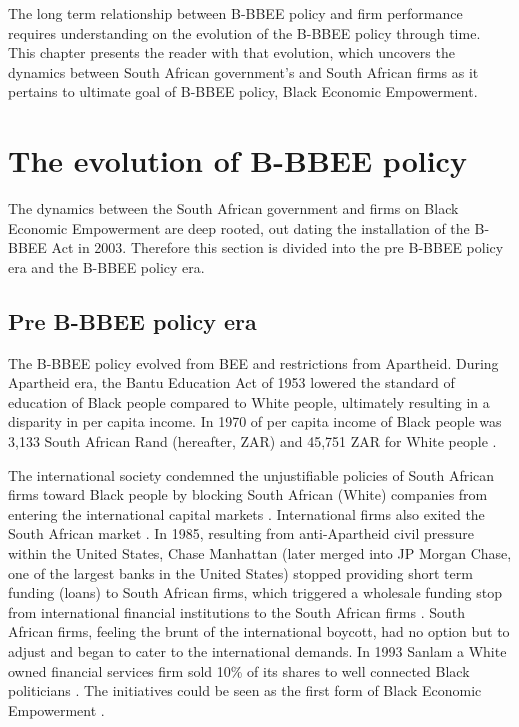 The long term relationship between B-BBEE policy and firm performance requires understanding on the evolution of the B-BBEE policy through time. This chapter presents the reader with that evolution, which uncovers the dynamics between South African government's and South African firms as it pertains to ultimate goal of B-BBEE policy, Black Economic Empowerment.
\section{The evolution of B-BBEE policy}
The dynamics between the South African government and firms on Black Economic Empowerment are deep rooted, out dating the installation of the B-BBEE Act in 2003. Therefore this section is divided into the pre B-BBEE policy era and the B-BBEE policy era.
\subsection{Pre B-BBEE policy era}
The B-BBEE policy evolved from BEE and restrictions from Apartheid. During Apartheid era, the Bantu Education Act of 1953 lowered the standard of education of Black people compared to White people, ultimately resulting in a disparity in per capita income. In 1970 of per capita income of Black people was 3,133 South African Rand (hereafter, ZAR) and 45,751 ZAR for White people \cite[p104-p105]{N30}. 

The international society condemned the unjustifiable policies of South African firms toward Black people by blocking South African (White) companies from entering the international capital markets
\cite[p3]{N24}. International firms also exited the South African market \cite[p3]{N24}. In 1985, resulting from anti-Apartheid civil pressure within the United States, Chase Manhattan (later merged into JP Morgan Chase, one of the largest banks in the United States) stopped providing short term funding (loans) to South African firms, which triggered a wholesale funding stop from international financial institutions to the South African firms \cite[p324]{N32}. South African firms, feeling the brunt of the international boycott, had no option but to adjust and began to cater to the international demands. In 1993 Sanlam a White owned financial services firm sold 10\%  of its shares to well connected Black politicians \cite[p6]{N23}. The initiatives could be seen as the first form of Black Economic Empowerment \cite[p6]{N23}.

